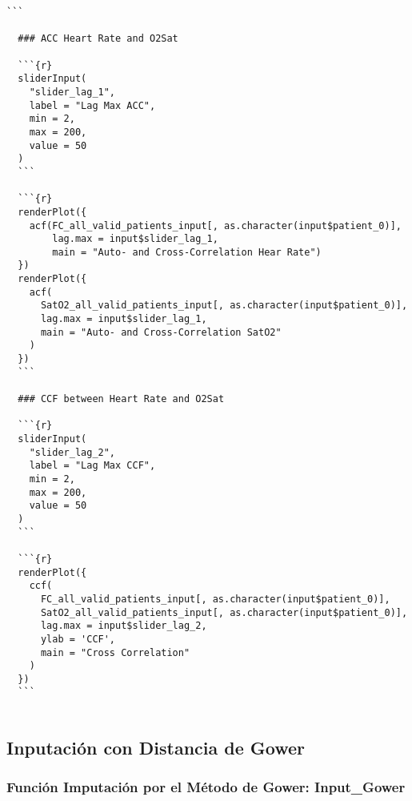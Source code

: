 \begin{lstlisting}[style=mystyle2,caption={Código Visualización de los Datos}, label={lst:codigo-visualizacion}]
  ```
  
  ### ACC Heart Rate and O2Sat
  
  ```{r}
  sliderInput(
    "slider_lag_1",
    label = "Lag Max ACC",
    min = 2,
    max = 200,
    value = 50
  )
  ```
  
  ```{r}
  renderPlot({
    acf(FC_all_valid_patients_input[, as.character(input$patient_0)],
        lag.max = input$slider_lag_1,
        main = "Auto- and Cross-Correlation Hear Rate")
  })
  renderPlot({
    acf(
      SatO2_all_valid_patients_input[, as.character(input$patient_0)],
      lag.max = input$slider_lag_1,
      main = "Auto- and Cross-Correlation SatO2"
    )
  })
  ```
  
  ### CCF between Heart Rate and O2Sat
  
  ```{r}
  sliderInput(
    "slider_lag_2",
    label = "Lag Max CCF",
    min = 2,
    max = 200,
    value = 50
  )
  ```
  
  ```{r}
  renderPlot({
    ccf(
      FC_all_valid_patients_input[, as.character(input$patient_0)],
      SatO2_all_valid_patients_input[, as.character(input$patient_0)],
      lag.max = input$slider_lag_2,
      ylab = 'CCF',
      main = "Cross Correlation"
    )
  })
  ```
  
\end{lstlisting}

\lstset{style=mystyle} 

\subsection{Inputación con Distancia de Gower}\label{sec:codigo-input-gower}

\subsubsection{Función Imputación por el Método de Gower: Input\_Gower}\label{sec:codigo-input-gower-fun}


